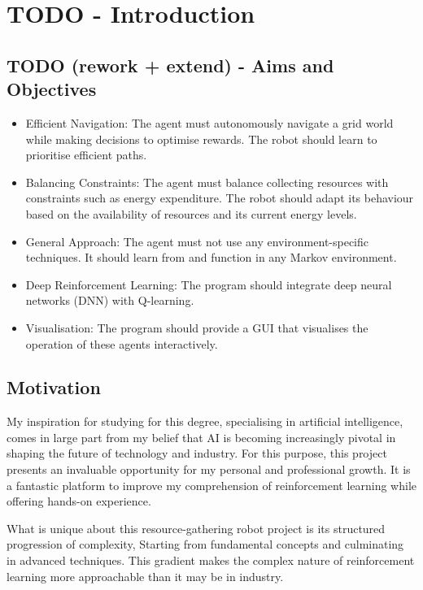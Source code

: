 \documentclass[]{final_report}
\begin{document}

\chapter{TODO - Introduction}




\section{TODO (rework + extend) - Aims and Objectives}
\begin{itemize}
  \item Efficient Navigation: The agent must autonomously navigate a grid world while making decisions to optimise rewards. The robot should learn to prioritise efficient paths.
  \item Balancing Constraints: The agent must balance collecting resources with constraints such as energy expenditure. The robot should adapt its behaviour based on the availability of resources and its current energy levels.
  \item General Approach: The agent must not use any environment-specific techniques. It should learn from and function in any Markov environment.
  \item Deep Reinforcement Learning: The program should integrate deep neural networks (DNN) with Q-learning.
  \item Visualisation: The program should provide a GUI that visualises the operation of these agents interactively.
\end{itemize}

\section{Motivation}

My inspiration for studying for this degree, specialising in artificial intelligence, comes in large part from my belief that AI is becoming increasingly pivotal in shaping the future of technology and industry. For this purpose, this project presents an invaluable opportunity for my personal and professional growth. It is a fantastic platform to improve my comprehension of reinforcement learning while offering hands-on experience. 

What is unique about this resource-gathering robot project is its structured progression of complexity, Starting from fundamental concepts and culminating in advanced techniques. This gradient makes the complex nature of reinforcement learning more approachable than it may be in industry. 
\end{document}
